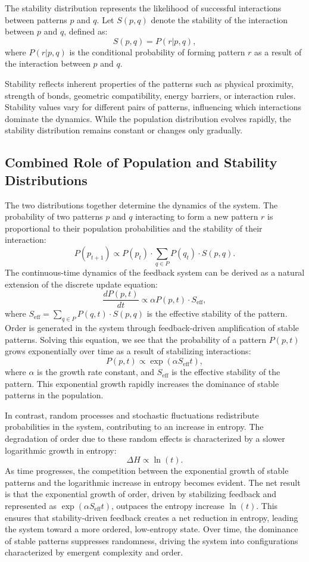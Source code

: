 \documentclass[entropy,article,submit,pdftex,moreauthors]{Definitions/mdpi}
\begin{document}
The stability distribution represents the likelihood of successful interactions between patterns \( p \) and \( q \). Let \( S(p, q) \) denote the stability of the interaction between \( p \) and \( q \), defined as:
\[
S(p, q) = P(r | p, q),
\]
where \( P(r | p, q) \) is the conditional probability of forming pattern \( r \) as a result of the interaction between \( p \) and \( q \).

Stability reflects inherent properties of the patterns such as physical proximity, strength of bonds, geometric compatibility, energy barriers, or interaction rules. Stability values vary for different pairs of patterns, influencing which interactions dominate the dynamics. While the population distribution evolves rapidly, the stability distribution remains constant or changes only gradually.

\subsection{Combined Role of Population and Stability Distributions}

The two distributions together determine the dynamics of the system. The probability of two patterns \( p \) and \( q \) interacting to form a new pattern \( r \) is proportional to their population probabilities and the stability of their interaction:
\[
P(p_{t+1}) \propto P(p_t) \cdot \sum_{q \in P} P(q_t) \cdot S(p, q).
\]
The continuous-time dynamics of the feedback system can be derived as a natural extension of the discrete update equation:
\[
\frac{dP(p, t)}{dt} \propto \alpha P(p, t) \cdot S_{\text{eff}},
\]
where \( S_{\text{eff}} = \sum_{q \in P} P(q, t) \cdot S(p, q) \) is the effective stability of the pattern. Order is generated in the system through feedback-driven amplification of stable patterns. Solving this equation, we see that the probability of a pattern \( P(p, t) \) grows exponentially over time as a result of stabilizing interactions:
\[
P(p, t) \propto \exp(\alpha S_{\text{eff}} t),
\]
where \( \alpha \) is the growth rate constant, and \( S_{\text{eff}} \) is the effective stability of the pattern. This exponential growth rapidly increases the dominance of stable patterns in the population.

In contrast, random processes and stochastic fluctuations redistribute probabilities in the system, contributing to an increase in entropy. The degradation of order due to these random effects is characterized by a slower logarithmic growth in entropy:
\[
\Delta H \propto \ln(t).
\]
As time progresses, the competition between the exponential growth of stable patterns and the logarithmic increase in entropy becomes evident. The net result is that the exponential growth of order, driven by stabilizing feedback and represented as \( \exp(\alpha S_{\text{eff}} t) \), outpaces the entropy increase \( \ln(t) \). This ensures that stability-driven feedback creates a net reduction in entropy, leading the system toward a more ordered, low-entropy state. Over time, the dominance of stable patterns suppresses randomness, driving the system into configurations characterized by emergent complexity and order.
\end{document}
